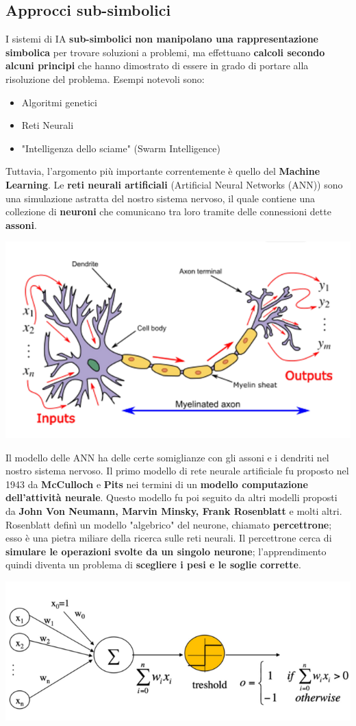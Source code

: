\documentclass[12pt]{article}
\begin{document}
\subsection{Approcci sub-simbolici}
I sistemi di IA \textbf{sub-simbolici} \textbf{non manipolano una rappresentazione simbolica} per trovare soluzioni a problemi, ma effettuano \textbf{calcoli secondo alcuni principi} che hanno dimostrato di essere in grado di portare alla risoluzione del problema.
Esempi notevoli sono:
\begin{itemize}
    \item Algoritmi genetici
    \item Reti Neurali
    \item "Intelligenza dello sciame" (Swarm Intelligence)
\end{itemize}
Tuttavia, l'argomento più importante correntemente è quello del \textbf{Machine Learning}.
Le \textbf{reti neurali artificiali} (Artificial Neural Networks (ANN)) sono una simulazione astratta del nostro sistema nervoso, il quale
contiene una collezione di \textbf{neuroni} che comunicano tra loro tramite delle connessioni dette \textbf{assoni}.
\begin{center}
    \includegraphics[width = 0.60\linewidth]{Images/4.PNG}
\end{center}
Il modello delle ANN ha delle certe somiglianze con gli assoni e i dendriti nel nostro sistema nervoso.
Il primo modello di rete neurale artificiale fu proposto nel 1943 da \textbf{McCulloch} e \textbf{Pits} nei termini di un \textbf{modello computazione dell'attività neurale}.
Questo modello fu poi seguito da altri modelli proposti da \textbf{John Von Neumann, Marvin Minsky, Frank Rosenblatt} e molti altri.
Rosenblatt definì un modello "algebrico" del neurone, chiamato \textbf{percettrone}; esso è una pietra miliare della ricerca sulle reti neurali.
Il percettrone cerca di \textbf{simulare le operazioni svolte da un singolo neurone}; l'apprendimento quindi diventa un problema di \textbf{scegliere i pesi e le soglie corrette}.
\begin{center}
    \includegraphics[width = 0.70\linewidth]{Images/5.PNG}
\end{center}
\end{document}
